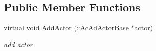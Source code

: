 \subsection*{Public Member Functions}
\begin{DoxyCompactItemize}
\item 
\hypertarget{classContent_1_1Physics_1_1PhysicsScene_aaa8e8f0d13743666b7418c7e900e92ae}{
virtual void \hyperlink{classContent_1_1Physics_1_1PhysicsScene_aaa8e8f0d13743666b7418c7e900e92ae}{AddActor} (::\hyperlink{classContent_1_1Actor_1_1Admin_1_1ActorBase}{AcAdActorBase} $\ast$actor)}
\label{classContent_1_1Physics_1_1PhysicsScene_aaa8e8f0d13743666b7418c7e900e92ae}

\begin{DoxyCompactList}\small\item\em add actor \item\end{DoxyCompactList}\end{DoxyCompactItemize}
